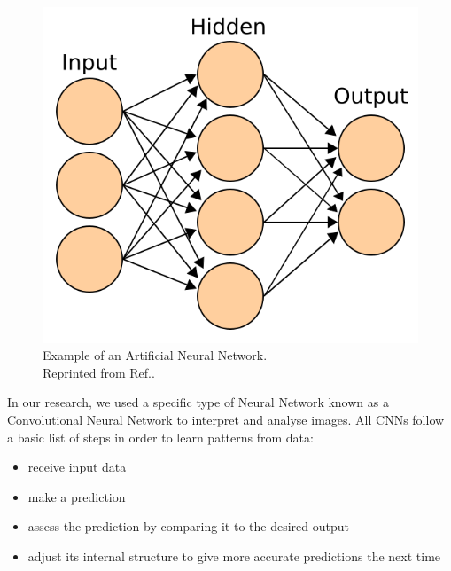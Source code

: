 \documentclass[conference]{IEEEtran}
\begin{document}
\begin{figure}[htb!]  %
  \centering
  \includegraphics[scale=0.3]{images/Artificial_neural_network.png}
  \caption{Example of an Artificial Neural Network. \\  \centering Reprinted from Ref.\cite{Artificial_Neural_Network}.}
  \label{fig:Artificial_Neural_Network}
\end{figure}

In our research, we used a specific type of Neural Network known as a Convolutional Neural Network to interpret and analyse images. All CNNs follow a basic list of steps in order to learn patterns from data:
\begin{itemize}
\item receive input data
\item make a prediction
\item assess the prediction by comparing it to the desired output
\item adjust its internal structure to give more accurate predictions the next time
\end{itemize}
\end{document}
